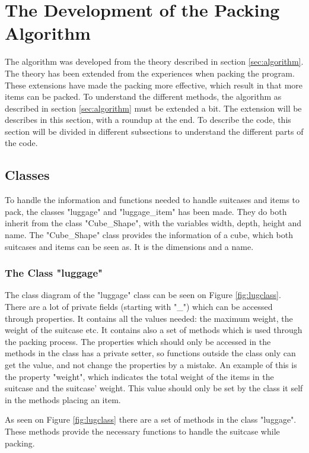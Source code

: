 \section{The Development of the Packing Algorithm}
\label{sec:devalgorithm}
The algorithm was developed from the theory described in section \ref{sec:algorithm}. The theory has been extended from the experiences when packing the program. These extensions have made the packing more effective, which result in that more items can be packed. 
To understand the different methods, the algorithm as described in section \ref{sec:algorithm} must be extended a bit. The extension will be describes in this section, with a roundup at the end. To describe the code, this section will be divided in different subsections to understand the different parts of the code.

\subsection{Classes}
To handle the information and functions needed to handle suitcases and items to pack, the classes "luggage" and "luggage\_item" has been made. They do both inherit from the class "Cube\_Shape", with the variables width, depth, height and name. The "Cube\_Shape" class provides the information of a cube, which both suitcases and items can be seen as. It is the dimensions and a name. 
\subsubsection{The Class "luggage"}
The class diagram of the "luggage" class can be seen on Figure \ref{fig:lugclass}. There are a lot of private fields (starting with "\_") which can be accessed through properties. It contains all the values needed: the maximum weight, the weight of the suitcase etc. It contains also a set of methods which is used through the packing process. The properties which should only be accessed in the methods in the class has a private setter, so functions outside the class only can get the value, and not change the properties by a mistake. An example of this is the property "weight", which indicates the total weight of the items in the suitcase and the suitcase' weight. This value should only be set by the class it self in the methods placing an item.


As seen on Figure \ref{fig:lugclass} there are a set of methods in the class "luggage". These methods provide the necessary functions to handle the suitcase while packing.

